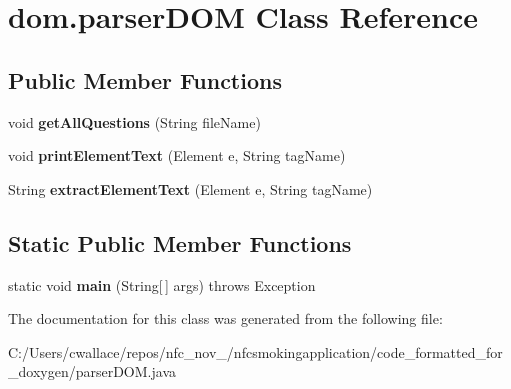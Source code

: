\hypertarget{classdom_1_1parser_d_o_m}{\section{dom.\-parser\-D\-O\-M Class Reference}
\label{classdom_1_1parser_d_o_m}
}
\subsection*{Public Member Functions}
\begin{DoxyCompactItemize}
\item 
\hypertarget{classdom_1_1parser_d_o_m_ad2a42f3385e9274826b8d9acbc0f1cb8}{void {\bfseries get\-All\-Questions} (String file\-Name)}\label{classdom_1_1parser_d_o_m_ad2a42f3385e9274826b8d9acbc0f1cb8}

\item 
\hypertarget{classdom_1_1parser_d_o_m_a6a2b93ad9c1d7df4389acfb72b8eaae0}{void {\bfseries print\-Element\-Text} (Element e, String tag\-Name)}\label{classdom_1_1parser_d_o_m_a6a2b93ad9c1d7df4389acfb72b8eaae0}

\item 
\hypertarget{classdom_1_1parser_d_o_m_a62ef7cc4cb3aa12ffc13ad438a1a4a60}{String {\bfseries extract\-Element\-Text} (Element e, String tag\-Name)}\label{classdom_1_1parser_d_o_m_a62ef7cc4cb3aa12ffc13ad438a1a4a60}

\end{DoxyCompactItemize}
\subsection*{Static Public Member Functions}
\begin{DoxyCompactItemize}
\item 
\hypertarget{classdom_1_1parser_d_o_m_af5173cf0851432cba3a91a90d69c1c4c}{static void {\bfseries main} (String\mbox{[}$\,$\mbox{]} args)  throws Exception }\label{classdom_1_1parser_d_o_m_af5173cf0851432cba3a91a90d69c1c4c}

\end{DoxyCompactItemize}


The documentation for this class was generated from the following file\-:\begin{DoxyCompactItemize}
\item 
C\-:/\-Users/cwallace/repos/nfc\-\_\-nov\-\_/nfcsmokingapplication/code\-\_\-formatted\-\_\-for\-\_\-doxygen/parser\-D\-O\-M.\-java\end{DoxyCompactItemize}
